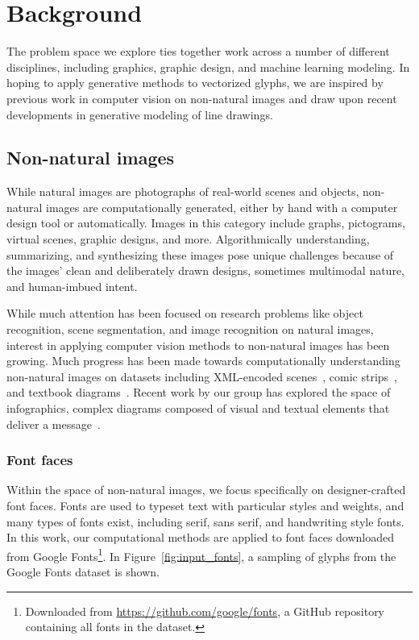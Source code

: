 \chapter{Background}
The problem space we explore ties together work across a number of different disciplines, including graphics, graphic design, and machine learning modeling.
In hoping to apply generative methods to vectorized glyphs, we are inspired by previous work in computer vision on non-natural images and draw upon recent developments in generative modeling of line drawings.

\section{Non-natural images}
While natural images are photographs of real-world scenes and objects, non-natural images are computationally generated, either by hand with a computer design tool or automatically.
Images in this category include graphs, pictograms, virtual scenes, graphic designs, and more.
Algorithmically understanding, summarizing, and synthesizing these images pose unique challenges because of the images' clean and deliberately drawn designs, sometimes multimodal nature, and human-imbued intent. 

While much attention has been focused on research problems like object recognition, scene segmentation, and image recognition on natural images, interest in applying computer vision methods to non-natural images has been growing.
Much progress has been made towards computationally understanding non-natural images on datasets including XML-encoded scenes~\cite{wu2017neural}, comic strips~\cite{iyyer2016amazing}, and textbook diagrams~\cite{seo2014diagram}.
Recent work by our group has explored the space of infographics, complex diagrams composed of visual and textual elements that deliver a message~\cite{bylinskii2017understanding}.

\subsection{Font faces}
Within the space of non-natural images, we focus specifically on designer-crafted font faces.
Fonts are used to typeset text with particular styles and weights, and many types of fonts exist, including serif, sans serif, and handwriting style fonts.
In this work, our computational methods are applied to font faces downloaded from Google Fonts\footnote{Downloaded from \url{https://github.com/google/fonts}, a GitHub repository containing all fonts in the dataset.}. In Figure~\ref{fig:input_fonts}, a sampling of glyphs from the Google Fonts dataset is shown.

